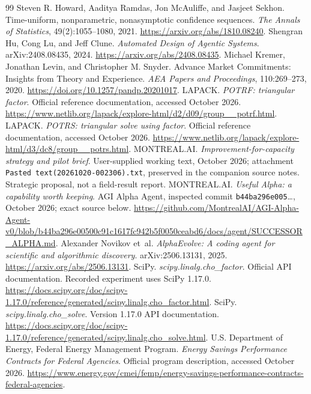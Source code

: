 \documentclass[11pt,letterpaper]{article}
\theoremstyle{remark}\newtheorem{remark}{Remark}[section]
\begin{document}
\begin{thebibliography}{99}
Steven R. Howard, Aaditya Ramdas, Jon McAuliffe, and Jasjeet Sekhon. Time-uniform, nonparametric, nonasymptotic confidence sequences. \emph{The Annals of Statistics}, 49(2):1055--1080, 2021. \url{https://arxiv.org/abs/1810.08240}.
Shengran Hu, Cong Lu, and Jeff Clune. \emph{Automated Design of Agentic Systems}. arXiv:2408.08435, 2024. \url{https://arxiv.org/abs/2408.08435}.
Michael Kremer, Jonathan Levin, and Christopher M. Snyder. Advance Market Commitments: Insights from Theory and Experience. \emph{AEA Papers and Proceedings}, 110:269--273, 2020. \url{https://doi.org/10.1257/pandp.20201017}.
LAPACK. \emph{POTRF: triangular factor}. Official reference documentation, accessed October 2026. \url{https://www.netlib.org/lapack/explore-html/d2/d09/group__potrf.html}.
LAPACK. \emph{POTRS: triangular solve using factor}. Official reference documentation, accessed October 2026. \url{https://www.netlib.org/lapack/explore-html/d3/dc8/group__potrs.html}.
MONTREAL.AI. \emph{Improvement-for-capacity strategy and pilot brief}. User-supplied working text, October 2026; attachment \texttt{Pasted text(20261020-002306).txt}, preserved in the companion source notes. Strategic proposal, not a field-result report.
MONTREAL.AI. \emph{Useful Alpha: a capability worth keeping}. AGI Alpha Agent, inspected commit \texttt{b44ba296e005}\ldots, October 2026; exact source below. \url{https://github.com/MontrealAI/AGI-Alpha-Agent-v0/blob/b44ba296e00500c91c1617fc942b5f0050ceabd6/docs/agent/SUCCESSOR_ALPHA.md}.
Alexander Novikov et~al. \emph{AlphaEvolve: A coding agent for scientific and algorithmic discovery}. arXiv:2506.13131, 2025. \url{https://arxiv.org/abs/2506.13131}.
SciPy. \emph{scipy.linalg.cho\_factor}. Official API documentation. Recorded experiment uses SciPy 1.17.0. \url{https://docs.scipy.org/doc/scipy-1.17.0/reference/generated/scipy.linalg.cho_factor.html}.
SciPy. \emph{scipy.linalg.cho\_solve}. Version 1.17.0 API documentation. \url{https://docs.scipy.org/doc/scipy-1.17.0/reference/generated/scipy.linalg.cho_solve.html}.
U.S. Department of Energy, Federal Energy Management Program. \emph{Energy Savings Performance Contracts for Federal Agencies}. Official program description, accessed October 2026. \url{https://www.energy.gov/cmei/femp/energy-savings-performance-contracts-federal-agencies}.

\end{thebibliography}
\end{document}
